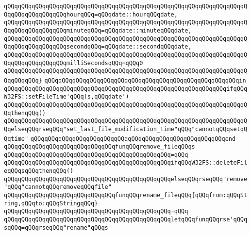\verb|qQQqqQQqqQQqqQQqqQQqqQQqqQQqqQQqqQQqqQQqqQQqqQQqqQQqqQQqqQQqqQQqqQQqqQQqqQQqqQQqqQQqqQQqhourqQQq=qQQqdate::hourqQQqdate,|\newline
\verb|qQQqqQQqqQQqqQQqqQQqqQQqqQQqqQQqqQQqqQQqqQQqqQQqqQQqqQQqqQQqqQQqqQQqqQQqqQQqqQQqqQQqqQQqminuteqQQq=qQQqdate::minuteqQQqdate,|\newline
\verb|qQQqqQQqqQQqqQQqqQQqqQQqqQQqqQQqqQQqqQQqqQQqqQQqqQQqqQQqqQQqqQQqqQQqqQQqqQQqqQQqqQQqqQQqsecondqQQq=qQQqdate::secondqQQqdate,|\newline
\verb|qQQqqQQqqQQqqQQqqQQqqQQqqQQqqQQqqQQqqQQqqQQqqQQqqQQqqQQqqQQqqQQqqQQqqQQqqQQqqQQqqQQqqQQqmilliSecondsqQQq=qQQq0|\newline
\verb|qQQqqQQqqQQqqQQqqQQqqQQqqQQqqQQqqQQqqQQqqQQqqQQqqQQqqQQqqQQqqQQqqQQqqQQqqQQqqQQq}|\newline
\verb|qQQqqQQqqQQqqQQqqQQqqQQqqQQqqQQqqQQqqQQqqQQqqQQqqQQqqQQqin|\newline
\verb|qQQqqQQqqQQqqQQqqQQqqQQqqQQqqQQqqQQqqQQqqQQqqQQqqQQqqQQqqQQqqQQqifqQQqW32FS::setFileTime'qQQq(s,qQQqdate')|\newline
\verb|qQQqqQQqqQQqqQQqqQQqqQQqqQQqqQQqqQQqqQQqqQQqqQQqqQQqqQQqqQQqqQQqqQQqqQQqthenqQQq()|\newline
\verb|qQQqqQQqqQQqqQQqqQQqqQQqqQQqqQQqqQQqqQQqqQQqqQQqqQQqqQQqqQQqqQQqqQQqqQQqelseqQQqrseqQQq"set_last_file_modification_time"qQQq"cannotqQQqsetqQQqtime"|\newline
\verb|qQQqqQQqqQQqqQQqqQQqqQQqqQQqqQQqqQQqqQQqqQQqqQQqqQQqqQQqend|\newline
\newline
\verb|qQQqqQQqqQQqqQQqqQQqqQQqqQQqqQQqfunqQQqremove_fileqQQqs|\newline
\verb|qQQqqQQqqQQqqQQqqQQqqQQqqQQqqQQqqQQqqQQqqQQqqQQq=qQQq|\newline
\verb|qQQqqQQqqQQqqQQqqQQqqQQqqQQqqQQqqQQqqQQqqQQqqQQqifqQQqW32FS::deleteFileqQQqsqQQqthenqQQq()|\newline
\verb|qQQqqQQqqQQqqQQqqQQqqQQqqQQqqQQqqQQqqQQqqQQqqQQqelseqQQqrseqQQq"remove"qQQq"cannotqQQqremoveqQQqfile"|\newline
\newline
\verb|qQQqqQQqqQQqqQQqqQQqqQQqqQQqqQQqfunqQQqrename_fileqQQq{qQQqfrom:qQQqString,qQQqto:qQQqStringqQQq}|\newline
\verb|qQQqqQQqqQQqqQQqqQQqqQQqqQQqqQQqqQQqqQQqqQQqqQQq=qQQq|\newline
\verb|qQQqqQQqqQQqqQQqqQQqqQQqqQQqqQQqqQQqqQQqqQQqqQQqletqQQqfunqQQqrse'qQQqsqQQq=qQQqrseqQQq"rename"qQQqs|\newline
